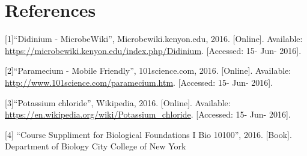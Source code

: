 \documentclass[12pt]{article}
\begin{document}
\section{References}
[1]``Didinium - MicrobeWiki'', Microbewiki.kenyon.edu, 2016. [Online]. Available: \url{https://microbewiki.kenyon.edu/index.php/Didinium}. [Accessed: 15- Jun- 2016].

[2]``Paramecium - Mobile Friendly'', 101science.com, 2016. [Online]. Available: \url{http://www.101science.com/paramecium.htm}. [Accessed: 15- Jun- 2016].

[3]``Potassium chloride'', Wikipedia, 2016. [Online]. Available: \url{https://en.wikipedia.org/wiki/Potassium\_chloride}. [Accessed: 15- Jun- 2016].

[4] ``Course Suppliment for Biological Foundations I Bio 10100'', 2016. [Book]. Department of Biology City College of New York
\end{document}
